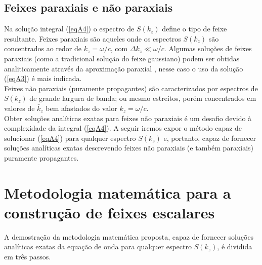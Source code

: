 \subsection{Feixes paraxiais e n\~ao paraxiais}
Na solução integral (\ref{eqA4}) o espectro de $S(k_z)$ define o tipo de feixe resultante. Feixes paraxiais são aqueles onde os espectros $S(k_z)$ são concentrados ao redor de $k_z = \omega /c$, com $\Delta k_z \ll \omega /c$. Algumas soluções de feixes paraxiais (como a tradicional solução do feixe gaussiano) podem ser obtidas analiticamente através da aproximação paraxial  \cite{Lya:3} \cite{Lya:4}\cite{Lya:12}, nesse caso o uso da solução (\ref{eqA3}) é mais indicada.\\
Feixes n\~ao paraxiais (puramente propagantes) s\~ao caracterizados por espectros de $S(k_z)$ de grande largura de banda; ou mesmo estreitos, por\'em concentrados em valores de $\bar{k}_z$ bem afastados do valor $k_z = \omega /c$.\\
Obter soluções analíticas exatas para feixes não paraxiais \'e um desafio devido à complexidade da integral (\ref{eqA4}). A seguir iremos expor o método capaz de solucionar (\ref{eqA4}) para qualquer espectro $S(k_z)$ e, portanto, capaz de fornecer soluções analíticas exatas descrevendo feixes não paraxiais (e também paraxiais) puramente propagantes. 
\section{Metodologia matem\'atica para a construção de feixes escalares } 	
A demostração da metodologia matemática proposta, capaz de fornecer soluções analíticas exatas da equação de onda para qualquer espectro $S(k_z)$, \'e dividida em três passos. 
